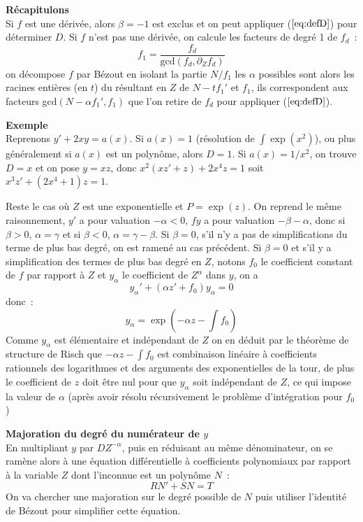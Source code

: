 \documentclass[a4paper,11pt]{article}
\begin{document}
\begin{giacjshere}
{\bf Récapitulons}\\
Si $f$ est une dérivée, alors $\beta=-1$ est exclus et on peut
appliquer (\(\ref{eq:defD}\)) pour déterminer $D$. Si $f$ n'est
pas une dérivée, on calcule les facteurs de degré 1 de $f_d$~:
\[ f_1=\frac{f_d}{\mbox{gcd}(f_d,\partial_Z f_d)} \]
on décompose $f$ par Bézout en isolant la partie $N/f_1$
les $\alpha$ possibles sont alors les racines entières (en $t$)
du résultant en $Z$ de $N-tf_1'$ et $f_1$, ils correspondent aux
facteurs gcd$(N-\alpha f_1',f_1)$ que l'on retire de $f_d$ pour
appliquer (\(\ref{eq:defD}\)).

{\bf Exemple}\\
Reprenons $y'+2xy=a(x)$. Si $a(x)=1$ (résolution de $\int \exp(x^2)$),
ou plus généralement si $a(x)$ est un polynôme,
alors $D=1$. Si $a(x)=1/x^2$, on trouve $D=x$ et on pose $y=xz$,
donc $x^2(xz'+z)+2x^4z=1$ soit $x^3z'+(2x^4+1)z=1$.

Reste le cas o\`u $Z$ est une exponentielle et $P=\exp(z)$. On reprend
le m\^eme raisonnement, $y'$ a pour valuation $-\alpha<0$, $fy$ a pour
valuation $-\beta-\alpha$, donc si $\beta > 0$,
$\alpha=\gamma$ et si $\beta<0$, $\alpha=\gamma-\beta$.
Si $\beta=0$, s'il n'y a pas de simplifications du terme de plus bas
degr\'e, on est ramen\'e au cas pr\'ec\'edent. 
Si $\beta=0$ et s'il y a simplification des termes de plus
bas degr\'e en $Z$, notons $f_0$ le coefficient constant de $f$ 
par rapport \`a $Z$ et $y_{\alpha}$ le coefficient de $Z^{\alpha}$
dans $y$, on a 
\[ y_\alpha ' + (\alpha z' + f_0) y_\alpha =0 \]
donc~:
\[ y_\alpha= \exp(-\alpha z-\int f_0)\]
Comme $y_\alpha$ est \'el\'ementaire et ind\'ependant de $Z$
on en d\'eduit par le th\'eor\`eme de structure de Risch
que $-\alpha z -\int f_0$ est combinaison lin\'eaire \`a coefficients
rationnels des logarithmes et des arguments des exponentielles de la tour,
de plus le coefficient de $z$ doit \^etre nul pour que $y_\alpha$ soit
ind\'ependant de $Z$, ce qui impose la valeur de $\alpha$ (apr\`es avoir
r\'esolu r\'ecursivement le probl\`eme d'int\'egration pour $f_0$)

{\bf Majoration du degr\'e du num\'erateur de $y$}\\
En multipliant $y$ par $D Z^{-\alpha}$, puis en réduisant au
même dénominateur,
on se ram\`ene alors à une équation différentielle à coefficients
polynomiaux par rapport \`a la variable $Z$ dont l'inconnue est un polynôme 
$N$~:
\begin{equation} \label{eq:rischdepol}
 R N' + S N = T
\end{equation}
On va chercher une majoration sur le degr\'e possible de $N$ puis
utiliser l'identit\'e de B\'ezout pour simplifier
cette \'equation. 


\end{giacjshere}
\end{document}
